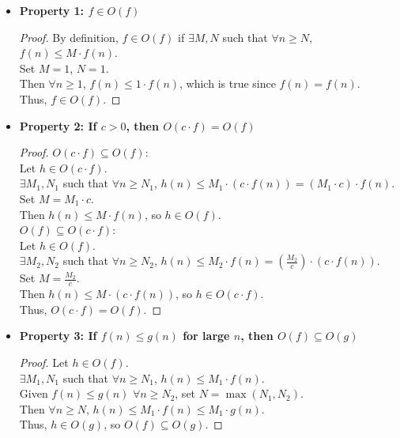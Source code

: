 \documentclass{article}
\theoremstyle{theorem}
\theoremstyle{definition}
\theoremstyle{remark}
\begin{document}
\begin{itemize}
    \item \textbf{Property 1: $f \in O(f)$}
    \begin{proof}
        By definition, $f \in O(f)$ if $\exists M, N$ such that $\forall n \geq N$, $f(n) \leq M \cdot f(n)$. \\
        Set $M = 1$, $N = 1$. \\
        Then $\forall n \geq 1$, $f(n) \leq 1 \cdot f(n)$, which is true since $f(n) = f(n)$. \\
        Thus, $f \in O(f)$.
    \end{proof}

    \item \textbf{Property 2: If $c > 0$, then $O(c \cdot f) = O(f)$}
    \begin{proof}
        \underline{$O(c \cdot f) \subseteq O(f)$}: \\
        Let $h \in O(c \cdot f)$. \\
        $\exists M_1, N_1$ such that $\forall n \geq N_1$, $h(n) \leq M_1 \cdot (c \cdot f(n)) = (M_1 \cdot c) \cdot f(n)$. \\
        Set $M = M_1 \cdot c$. \\
        Then $h(n) \leq M \cdot f(n)$, so $h \in O(f)$. \vspace{1mm} \\
        \underline{$O(f) \subseteq O(c \cdot f)$}: \\
        Let $h \in O(f)$. \\
        $\exists M_2, N_2$ such that $\forall n \geq N_2$, $h(n) \leq M_2 \cdot f(n) = \left(\frac{M_2}{c}\right) \cdot (c \cdot f(n))$. \\
        Set $M = \frac{M_2}{c}$. \\
        Then $h(n) \leq M \cdot (c \cdot f(n))$, so $h \in O(c \cdot f)$. \\
        Thus, $O(c \cdot f) = O(f)$.
    \end{proof}

    \item \textbf{Property 3: If $f(n) \leq g(n)$ for large $n$, then $O(f) \subseteq O(g)$}
    \begin{proof}
        Let $h \in O(f)$. \\
        $\exists M_1, N_1$ such that $\forall n \geq N_1$, $h(n) \leq M_1 \cdot f(n)$. \\
        Given $f(n) \leq g(n)$ $\forall n \geq N_2$, set $N = \max(N_1, N_2)$. \\
        Then $\forall n \geq N$, $h(n) \leq M_1 \cdot f(n) \leq M_1 \cdot g(n)$. \\
        Thus, $h \in O(g)$, so $O(f) \subseteq O(g)$.
    \end{proof}


\end{itemize}
\end{document}
